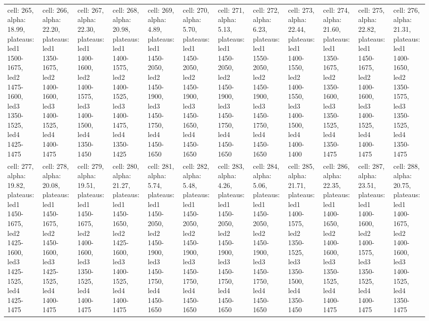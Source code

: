 \begin{landscape}
\begin{longtable}{|l|l|l|l|l|l|l|l|l|l|l|l|}
\rowcolor{lightgray} cell: 265, alpha: 18.99, plateaus: led1 1500-1675, led2 1475-1600, led3 1350-1525, led4 1425-1475 &cell: 266, alpha: 22.20, plateaus: led1 1350-1675, led2 1400-1600, led3 1400-1525, led4 1400-1475 &cell: 267, alpha: 22.30, plateaus: led1 1400-1600, led2 1400-1575, led3 1400-1500, led4 1350-1450 &cell: 268, alpha: 20.98, plateaus: led1 1400-1575, led2 1400-1525, led3 1400-1475, led4 1350-1425 &cell: 269, alpha: 4.89, plateaus: led1 1450-2050, led2 1450-1900, led3 1450-1750, led4 1450-1650 &cell: 270, alpha: 5.70, plateaus: led1 1450-2050, led2 1450-1900, led3 1450-1650, led4 1450-1650 &cell: 271, alpha: 5.13, plateaus: led1 1450-2050, led2 1450-1900, led3 1450-1750, led4 1450-1650 &cell: 272, alpha: 6.23, plateaus: led1 1550-2050, led2 1450-1900, led3 1450-1750, led4 1450-1650 &cell: 273, alpha: 22.44, plateaus: led1 1400-1550, led2 1400-1550, led3 1400-1500, led4 1400-1400 &cell: 274, alpha: 21.60, plateaus: led1 1350-1675, led2 1350-1600, led3 1350-1525, led4 1350-1475 &cell: 275, alpha: 22.82, plateaus: led1 1450-1675, led2 1400-1600, led3 1400-1525, led4 1400-1475 &cell: 276, alpha: 21.31, plateaus: led1 1400-1650, led2 1350-1575, led3 1350-1525, led4 1350-1475 \\
cell: 277, alpha: 19.82, plateaus: led1 1450-1675, led2 1425-1600, led3 1425-1525, led4 1425-1475 &cell: 278, alpha: 20.08, plateaus: led1 1450-1675, led2 1450-1600, led3 1425-1525, led4 1400-1475 &cell: 279, alpha: 19.51, plateaus: led1 1450-1675, led2 1400-1600, led3 1350-1525, led4 1400-1475 &cell: 280, alpha: 21.27, plateaus: led1 1450-1650, led2 1425-1600, led3 1400-1525, led4 1400-1475 &cell: 281, alpha: 5.74, plateaus: led1 1450-2050, led2 1450-1900, led3 1450-1750, led4 1450-1650 &cell: 282, alpha: 5.48, plateaus: led1 1450-2050, led2 1450-1900, led3 1450-1750, led4 1450-1650 &cell: 283, alpha: 4.26, plateaus: led1 1450-2050, led2 1450-1900, led3 1450-1750, led4 1450-1650 &cell: 284, alpha: 5.06, plateaus: led1 1450-2050, led2 1450-1900, led3 1450-1750, led4 1450-1650 &cell: 285, alpha: 21.71, plateaus: led1 1400-1575, led2 1350-1525, led3 1350-1500, led4 1350-1450 &cell: 286, alpha: 22.35, plateaus: led1 1400-1650, led2 1400-1600, led3 1350-1525, led4 1400-1475 &cell: 287, alpha: 23.51, plateaus: led1 1400-1600, led2 1400-1575, led3 1350-1525, led4 1400-1475 &cell: 288, alpha: 20.75, plateaus: led1 1400-1675, led2 1400-1600, led3 1400-1525, led4 1350-1475 \\
\end{longtable}
\end{landscape}

